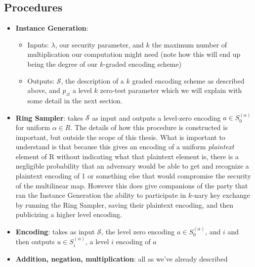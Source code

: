 \documentclass[12pt,twoside]{reedthesis}
\begin{document}
    
 
  
    
     
         
    
    \subsection{Procedures}
    \begin{itemize}
    \item \textbf{Instance Generation}: 
    	\begin{itemize}
    \item Inputs: $\lambda$, our security parameter, and $k$ the maximum number of multiplication our computation might need (note how this will end up being the degree of our $k$-graded encoding scheme)  
    \item Outputs: $\mathcal{S}$, the description of a $k$ graded encoding scheme as described above, and $p_{zt}$ a level $k$ zero-test parameter which we will explain with some detail in the next section.
    	\end{itemize}  
	\item \textbf{Ring Sampler}: takes $\mathcal{S}$ as input and outputs a level-zero encoding $a \in S_0^{(\alpha)}$ for uniform $\alpha \in R$. The details of how this procedure is constructed is important, but outside the scope of this thesis. What is important to understand is that because this gives an encoding of a uniform \textit{plaintext} element of R without  indicating what that plaintext element is, there is a negligible probability that an adversary would be able to get and recognize a plaintext encoding of 1 or something else that would compromise the security of the multilinear map. However this does give companions of the party that ran the Instance Generation the ability to participate in $k$-nary key exchange by running the Ring Sampler, saving their plaintext encoding, and then publicizing a higher level encoding.
	\item \textbf{Encoding}: takes as input $\mathcal{S}$, the level zero encoding $a\in S_0^{(\alpha)}$, and $i$ and then outputs $u\in S_i^{(\alpha)}$, a level $i$ encoding of $a$
	\item \textbf{Addition, negation, multiplication}: all as we've already described
    \end{itemize}
    
\end{document}

